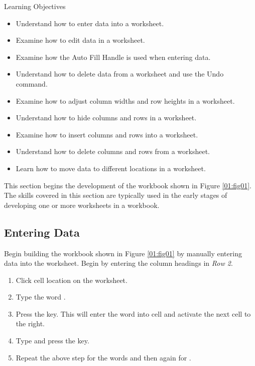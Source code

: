 \begin{center}
	\begin{objbox}{Learning Objectives}
		\begin{itemize}
			\setlength{\itemsep}{0pt}
			\setlength{\parskip}{0pt}
			\setlength{\parsep}{0pt}
			
			\item Understand how to enter data into a worksheet.
			\item Examine how to edit data in a worksheet.
			\item Examine how the Auto Fill Handle is used when entering data.
			\item Understand how to delete data from a worksheet and use the Undo command.
			\item Examine how to adjust column widths and row heights in a worksheet.
			\item Understand how to hide columns and rows in a worksheet.
			\item Examine how to insert columns and rows into a worksheet.
			\item Understand how to delete columns and rows from a worksheet.
			\item Learn how to move data to different locations in a worksheet.

		\end{itemize}
	\end{objbox}
\end{center}

This section begins the development of the workbook shown in Figure \ref{01:fig01}. The skills covered in this section are typically used in the early stages of developing one or more worksheets in a workbook.

\subsection{Entering Data}

Begin building the workbook shown in Figure \ref{01:fig01} by manually entering data into the worksheet. Begin by entering the column headings in \textit{Row 2}.

\begin{enumbox}
	\begin{enumerate}
		\item Click cell location  on the worksheet.
		\item Type the word .
		\item Press the  key. This will enter the word into cell  and activate the next cell to the right.
		\item Type  and press the  key.
		\item Repeat the above step for the words  and then again for .
	\end{enumerate}
\end{enumbox}
	
